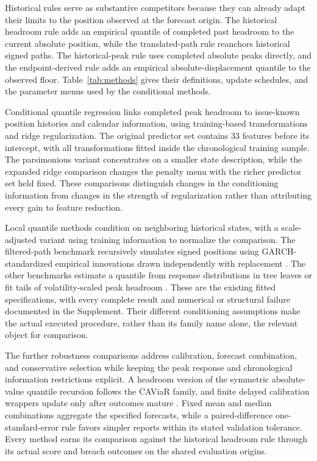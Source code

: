 \documentclass[11pt,a4paper]{article}
\begin{document}
Historical rules serve as substantive competitors because they can already adapt their limits to the position observed at the forecast origin. The historical headroom rule adds an empirical quantile of completed past headroom to the current absolute position, while the translated-path rule reanchors historical signed paths. The historical-peak rule uses completed absolute peaks directly, and the endpoint-derived rule adds an empirical absolute-displacement quantile to the observed floor. Table~\ref{tab:methods} gives their definitions, update schedules, and the parameter menus used by the conditional methods.


Conditional quantile regression links completed peak headroom to issue-known position histories and calendar information, using training-based transformations and ridge regularization. The original predictor set contains 33 features before its intercept, with all transformations fitted inside the chronological training sample. The parsimonious variant concentrates on a smaller state description, while the expanded ridge comparison changes the penalty menu with the richer predictor set held fixed. These comparisons distinguish changes in the conditioning information from changes in the strength of regularization rather than attributing every gain to feature reduction.


Local quantile methods condition on neighboring historical states, with a scale-adjusted variant using training information to normalize the comparison. The filtered-path benchmark recursively simulates signed positions using GARCH-standardized empirical innovations drawn independently with replacement \citep{hull1998,barone1999}. The other benchmarks estimate a quantile from response distributions in tree leaves or fit tails of volatility-scaled peak headroom \citep{meinshausen2006,mcneilfrey2000}. These are the existing fitted specifications, with every complete result and numerical or structural failure documented in the Supplement. Their different conditioning assumptions make the actual executed procedure, rather than its family name alone, the relevant object for comparison.


The further robustness comparisons address calibration, forecast combination, and conservative selection while keeping the peak response and chronological information restrictions explicit. A headroom version of the symmetric absolute-value quantile recursion follows the CAViaR family, and finite delayed calibration wrappers update only after outcomes mature \citep{engle2004,gibbs2021}. Fixed mean and median combinations aggregate the specified forecasts, while a paired-difference one-standard-error rule favors simpler reports within its stated validation tolerance. Every method earns its comparison against the historical headroom rule through its actual score and breach outcomes on the shared evaluation origins.
\end{document}
